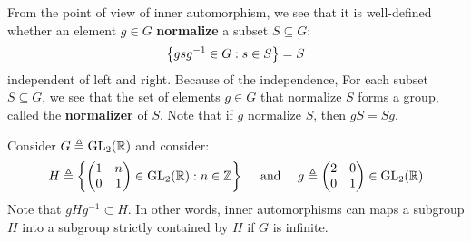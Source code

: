 \documentclass{report}
\begin{document}
From the point of view of inner automorphism, we see that it is well-defined whether an element $g\in G$ \textbf{normalize} a subset $S\subseteq G$:
\begin{align*}
\left\{ gsg^{-1} \in G: s \in S \right\} = S
\end{align*}
independent of left and right.  Because of the independence, For each subset $S\subseteq G$, we see that the set of elements $g\in G$ that normalize $S$ forms a group, called the \textbf{normalizer} of $S$. Note that if $g$ normalize  $S$, then $gS = Sg$.   \\







\begin{example}
  Consider $G\triangleq \operatorname{GL}_2(\mathbb{R})$  and consider: 
\begin{align*}
H\triangleq \left\{  \begin{pmatrix}
    1 & n \\
    0 & 1
\end{pmatrix} \in \operatorname{GL}_2(\mathbb{R}) : n \in\mathbb{Z} \right\}  \quad \text{ and }\quad g\triangleq \begin{pmatrix} 
 2 & 0 \\
 0 & 1
\end{pmatrix} \in \operatorname{GL}_2(\mathbb{R})
\end{align*}
Note that $gHg^{-1}\subset H $. In other words, inner automorphisms can maps a subgroup $H$ into a subgroup strictly contained by $H$ if  $G$ is infinite. 
\end{example}
\end{document}
